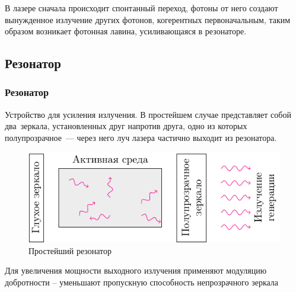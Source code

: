 \documentclass[10pt,pdf,hyperref={unicode}, dvipsnames]{beamer}
\newcommand\frametitless[1]{\subsection{#1}\frametitle{#1}}
\begin{document}
\begin{frame}[t]
	В лазере сначала происходит спонтанный переход, фотоны от него создают вынужденное излучение других фотонов, когерентных первоначальным, таким образом возникает фотонная лавина, усиливающаяся в резонаторе.

\end{frame}
\begin{frame}[t]
	\frametitless{Резонатор}

	Устройство для усиления излучения.
	В простейшем случае представляет собой два зеркала, установленных друг напротив друга, одно из которых полупрозрачное — через него луч лазера частично выходит из резонатора.

	\begin{figure}[h]
		\centering
		\includegraphics[]{images/resonator}
		\caption{Простейший резонатор}
	\end{figure}	

	Для увеличения мощности выходного излучения применяют модуляцию добротности – уменьшают пропускную способность непрозрачного зеркала
\end{frame}


\end{document}
